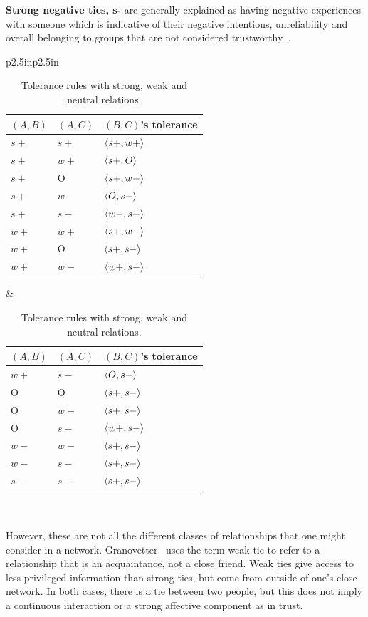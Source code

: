 {{\bf Strong negative ties, s-} are generally explained as
having negative experiences with someone which is indicative of their
negative intentions, unreliability and overall belonging to groups
that are not considered trustworthy~\cite{Fiske:2007}. 

\begin{table}[htbp!]
\begin{center}
\caption{\label{tab:weak_strong_tolerance}Tolerance rules with strong, weak and neutral relations.}
\begin{tabular}{p{2.5in}p{2.5in}}
 \begin{tabular}{p{0.5in}p{0.5in}p{1.2in}} 
$(A,B)$ & $(A,C)$ & $(B,C)$'s tolerance \\ \hline
$s+$ & $s+$ & $\langle s+,w+\rangle$ \\
$s+$ & $w+$ & $\langle s+,O\rangle$  \\
$s+$ & O & $\langle s+,w-\rangle$ \\
$s+$ & $w-$ & $\langle O,s-\rangle$ \\ 
$s+$ & $s-$ &   $\langle w-,s-\rangle$ \\
$w+$ & $w+$ & $\langle s+,w-\rangle$ \\
$w+$ & O & $\langle s+,s-\rangle$ \\ 
$w+$ & $w-$ & $\langle w+,s-\rangle$ 
\end{tabular} &
 \begin{tabular}{p{0.5in}p{0.5in}p{1.2in}} 
$(A,B)$ & $(A,C)$ & $(B,C)$'s tolerance \\ \hline
$w+$ & $s-$ & $\langle O,s-\rangle$ \\ 
O & O & $\langle s+,s-\rangle$ \\ 
O & $w-$ & $\langle s+,s-\rangle$ \\ 
O & $s-$ &  $\langle w+,s-\rangle$ \\ 
$w-$ & $w-$ & $\langle s+,s-\rangle$ \\ 
$w-$ & $s-$ & $\langle s+,s-\rangle$ \\ 
$s-$ & $s-$ & $\langle s+,s-\rangle$ \\
& & 
\end{tabular}
\end{tabular} \\\vspace{4mm} 
\end{center}
\end{table}

However, these are not all the different classes of relationships that
one might consider in a network. Granovetter~\cite{Granovetter:1973} uses the term
weak tie to refer to a relationship that is an acquaintance, not a
close friend. Weak ties give access to less privileged information
than strong ties, but come from outside of one's close network. In
both cases, there is a tie between two people, but this
does not imply a continuous interaction or a strong affective
component as in trust.

}
